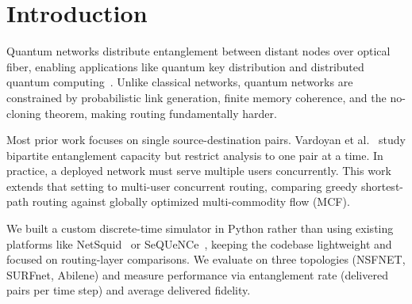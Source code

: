 \section{Introduction}
\label{sec:introduction}

Quantum networks distribute entanglement between distant nodes over optical fiber, enabling applications like quantum key distribution and distributed quantum computing~\cite{kimble2008quantum, wehner2018quantum}. Unlike classical networks, quantum networks are constrained by probabilistic link generation, finite memory coherence, and the no-cloning theorem, making routing fundamentally harder.

Most prior work focuses on single source-destination pairs. Vardoyan et al.~\cite{vardoyan2024bipartite} study bipartite entanglement capacity but restrict analysis to one pair at a time. In practice, a deployed network must serve multiple users concurrently. This work extends that setting to multi-user concurrent routing, comparing greedy shortest-path routing against globally optimized multi-commodity flow (MCF).

We built a custom discrete-time simulator in Python rather than using existing platforms like NetSquid~\cite{coopmans2021netsquid} or SeQUeNCe~\cite{wu2021sequence}, keeping the codebase lightweight and focused on routing-layer comparisons. We evaluate on three topologies (NSFNET, SURFnet, Abilene) and measure performance via entanglement rate (delivered pairs per time step) and average delivered fidelity.
